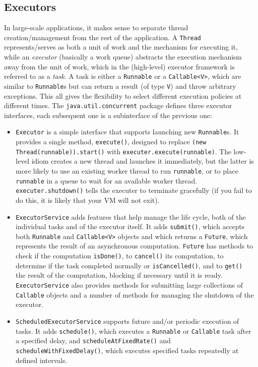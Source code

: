 \documentclass[8pt, table, xcdraw]{article}%
\begin{document}
\subsection{Executors}

In large-scale applications, it makes sense to separate thread creation/management from the rest of the application. A \lstinline{Thread} represents/serves as both a unit of work and the mechanism for executing it, while an \emph{executor} (basically a work queue) abstracts the execution mechanism away from the unit of work, which in the (high-level) executor framework is referred to as a \emph{task}. A task is either a \lstinline{Runnable} or a \lstinline{Callable<V>}, which are similar to \lstinline{Runnable}s but can return a result (of type \lstinline{V}) and throw arbitrary exceptions. This all gives the flexibility to select different execution policies at different times. The \lstinline{java.util.concurrent} package defines three executor interfaces, each subsequent one is a subinterface of the previous one:

\begin{itemize}
    \item \lstinline{Executor} is a simple interface that supports launching new \lstinline{Runnable}s. It provides a single method, \lstinline{execute()}, designed to replace \lstinline{(new Thread(runnable)).start()} with \lstinline{executer.execute(runnable)}. The low-level idiom creates a new thread and launches it immediately, but the latter is more likely to use an existing worker thread to run \lstinline{runnable}, or to place \lstinline{runnable} in a queue to wait for an available worker thread. \lstinline{executer.shutdown()} tells the executer to terminate gracefully (if you fail to do this, it is likely that your VM will not exit).
    \item \lstinline{ExecutorService} adds features that help manage the life cycle, both of the individual tasks and of the executor itself. It adds \lstinline{submit()}, which accepts both \lstinline{Runnable} and \lstinline{Callable<V>} objects and which returns a \lstinline{Future}, which represents the result of an asynchronous computation. \lstinline{Future} has methods to check if the computation \lstinline{isDone()}, to \lstinline{cancel()} its computation, to determine if the task completed normally or \lstinline{isCancelled()}, and to \lstinline{get()} the result of the computation, blocking if necessary until it is ready. \lstinline{ExecutorService} also provides methods for submitting large collections of \lstinline{Callable} objects and a number of methods for managing the shutdown of the executor.
    \item \lstinline{ScheduledExecutorService} supports future and/or periodic execution of tasks. It adds \lstinline{schedule()}, which executes a \lstinline{Runnable} or \lstinline{Callable} task after a specified delay, and \lstinline{scheduleAtFixedRate()} and \lstinline{scheduleWithFixedDelay()}, which executes specified tasks repeatedly at defined intervals.
\end{itemize}
\end{document}
